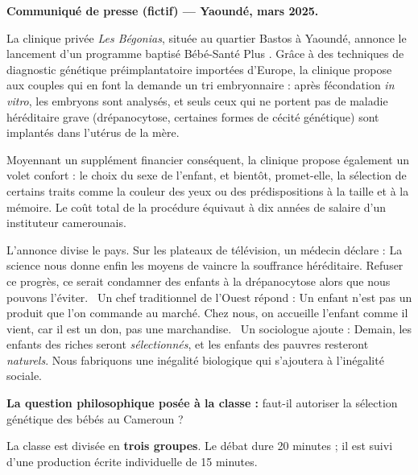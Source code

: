 \documentclass[11pt]{article}
\newcounter{popsec}
\newcounter{popsub}
\newcommand{\courssub}[1]{%
  \stepcounter{popsub}%
  \par\vspace{9pt}\noindent{\popxbold\fontsize{11.5}{13}\selectfont\color{popink}{\color{poporange}\thepopsec.\thepopsub}\hspace{6pt}#1}\par\nopagebreak\vspace{4pt}
}
\begin{document}
\courssub{Situation}

\textbf{Communiqué de presse (fictif) — Yaoundé, mars 2025.}

La clinique privée \emph{Les Bégonias}, située au quartier Bastos à Yaoundé, annonce le lancement d'un programme baptisé \guillemotleft Bébé-Santé Plus \guillemotright. Grâce à des techniques de diagnostic génétique préimplantatoire importées d'Europe, la clinique propose aux couples qui en font la demande un \guillemotleft tri embryonnaire \guillemotright : après fécondation \emph{in vitro}, les embryons sont analysés, et seuls ceux qui ne portent pas de maladie héréditaire grave (drépanocytose, certaines formes de cécité génétique) sont implantés dans l'utérus de la mère.

Moyennant un supplément financier conséquent, la clinique propose également un \guillemotleft volet confort \guillemotright : le choix du sexe de l'enfant, et bientôt, promet-elle, la sélection de certains traits comme la couleur des yeux ou des prédispositions à la taille et à la mémoire. Le coût total de la procédure équivaut à dix années de salaire d'un instituteur camerounais.

L'annonce divise le pays. Sur les plateaux de télévision, un médecin déclare : \guillemotleft La science nous donne enfin les moyens de vaincre la souffrance héréditaire. Refuser ce progrès, ce serait condamner des enfants à la drépanocytose alors que nous pouvons l'éviter. \guillemotright\ Un chef traditionnel de l'Ouest répond : \guillemotleft Un enfant n'est pas un produit que l'on commande au marché. Chez nous, on accueille l'enfant comme il vient, car il est un don, pas une marchandise. \guillemotright\ Un sociologue ajoute : \guillemotleft Demain, les enfants des riches seront \emph{sélectionnés}, et les enfants des pauvres resteront \emph{naturels}. Nous fabriquons une inégalité biologique qui s'ajoutera à l'inégalité sociale. \guillemotright

\textbf{La question philosophique posée à la classe :} faut-il autoriser la sélection génétique des bébés au Cameroun ?

\courssub{Consignes}

La classe est divisée en \textbf{trois groupes}. Le débat dure 20 minutes ; il est suivi d'une production écrite individuelle de 15 minutes.
\end{document}

